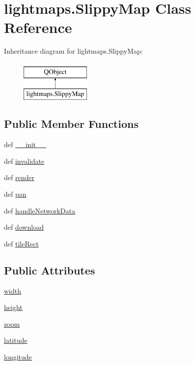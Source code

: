 \hypertarget{classlightmaps_1_1SlippyMap}{}\section{lightmaps.\+Slippy\+Map Class Reference}
\label{classlightmaps_1_1SlippyMap}
Inheritance diagram for lightmaps.\+Slippy\+Map\+:\begin{figure}[H]
\begin{center}
\leavevmode
\includegraphics[height=2.000000cm]{classlightmaps_1_1SlippyMap}
\end{center}
\end{figure}
\subsection*{Public Member Functions}
\begin{DoxyCompactItemize}
\item 
def \hyperlink{classlightmaps_1_1SlippyMap_a1ffedbde8a4ae95e8a3753e61a185766}{\+\_\+\+\_\+init\+\_\+\+\_\+}
\item 
def \hyperlink{classlightmaps_1_1SlippyMap_adc87effc68ebdfc7ca9938751254df8c}{invalidate}
\item 
def \hyperlink{classlightmaps_1_1SlippyMap_add42ab4810f8dde9f11f8a93170e02a7}{render}
\item 
def \hyperlink{classlightmaps_1_1SlippyMap_a1adb1ffd5fecce9978c6816ae7baa5c4}{pan}
\item 
def \hyperlink{classlightmaps_1_1SlippyMap_ad5e66116e703d9742f8da715591c3255}{handle\+Network\+Data}
\item 
def \hyperlink{classlightmaps_1_1SlippyMap_a64faedf11d3376ad2e13d07702b696de}{download}
\item 
def \hyperlink{classlightmaps_1_1SlippyMap_a7cec8b15a396fb3cb027e69704b35a21}{tile\+Rect}
\end{DoxyCompactItemize}
\subsection*{Public Attributes}
\begin{DoxyCompactItemize}
\item 
\hyperlink{classlightmaps_1_1SlippyMap_aa59c387b9168336e818c7649f4796edd}{width}
\item 
\hyperlink{classlightmaps_1_1SlippyMap_aafc5a29115460eb5ce33d93e63ebfb83}{height}
\item 
\hyperlink{classlightmaps_1_1SlippyMap_a48e6c1ba2e7bd1fe16f6e10c72e241dc}{zoom}
\item 
\hyperlink{classlightmaps_1_1SlippyMap_a4b93cb980a7b4b17001661fe74e7f389}{latitude}
\item 
\hyperlink{classlightmaps_1_1SlippyMap_a84e83a77631aa2a489fdaeca09e7fd27}{longitude}
\end{DoxyCompactItemize}
